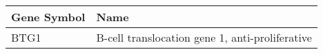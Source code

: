 \begin{tabular}{ll}
\toprule
Gene Symbol &                                            Name \\
\midrule
       BTG1 & B-cell translocation gene 1, anti-proliferative \\
\bottomrule
\end{tabular}
